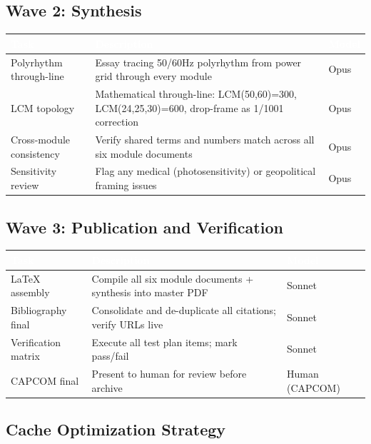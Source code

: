 \documentclass[11pt,letterpaper]{article}
\newcommand{\tableheader}[1]{\textbf{\sffamily\textcolor{white}{#1}}}
\begin{document}
\subsection{Wave 2: Synthesis}

\begin{center}
\begin{tabularx}{\textwidth}{L{4cm}XC{2cm}}
\toprule
{}
\tableheader{Task} & \tableheader{Description} & \tableheader{Model} \\
\midrule
Polyrhythm through-line & Essay tracing 50/60Hz polyrhythm from power grid through every module & Opus \\
LCM topology & Mathematical through-line: LCM(50,60)=300, LCM(24,25,30)=600, drop-frame as 1/1001 correction & Opus \\
Cross-module consistency & Verify shared terms and numbers match across all six module documents & Opus \\
Sensitivity review & Flag any medical (photosensitivity) or geopolitical framing issues & Opus \\
\bottomrule
\end{tabularx}
\end{center}

\subsection{Wave 3: Publication and Verification}

\begin{center}
\begin{tabularx}{\textwidth}{L{4cm}XC{2cm}}
\toprule
{}
\tableheader{Task} & \tableheader{Description} & \tableheader{Model} \\
\midrule
LaTeX assembly & Compile all six module documents + synthesis into master PDF & Sonnet \\
Bibliography final & Consolidate and de-duplicate all citations; verify URLs live & Sonnet \\
Verification matrix & Execute all test plan items; mark pass/fail & Sonnet \\
CAPCOM final & Present to human for review before archive & Human (CAPCOM) \\
\bottomrule
\end{tabularx}
\end{center}

\subsection{Cache Optimization Strategy}
\end{document}
